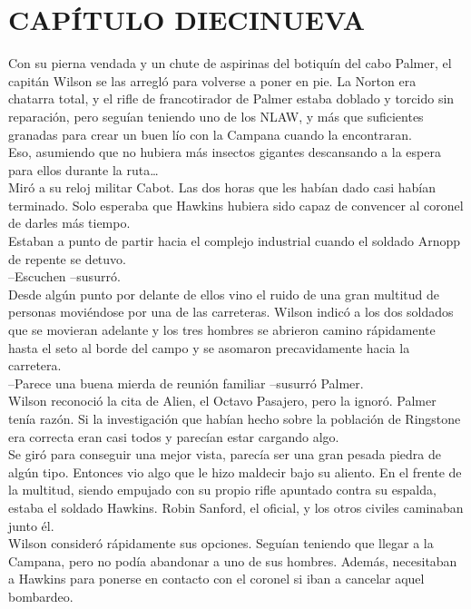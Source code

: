 \chapter*{CAPÍTULO DIECINUEVA}
Con su pierna vendada y un chute de aspirinas del botiquín del cabo
Palmer, el capitán Wilson se las arregló para volverse a poner en pie.
La Norton era chatarra total, y el rifle de francotirador de Palmer
estaba doblado y torcido sin reparación, pero seguían teniendo uno de
los NLAW, y más que suficientes granadas para crear un buen lío con la
Campana cuando la encontraran.\\
Eso, asumiendo que no hubiera más insectos gigantes descansando a la
espera para ellos durante la ruta\ldots{}\\
Miró a su reloj militar Cabot. Las dos horas que les habían dado casi
habían terminado. Solo esperaba que Hawkins hubiera sido capaz de
convencer al coronel de darles más tiempo.\\
Estaban a punto de partir hacia el complejo industrial cuando el soldado
Arnopp de repente se detuvo.\\
--Escuchen --susurró.\\
Desde algún punto por delante de ellos vino el ruido de una gran
multitud de personas moviéndose por una de las carreteras. Wilson indicó
a los dos soldados que se movieran adelante y los tres hombres se
abrieron camino rápidamente hasta el seto al borde del campo y se
asomaron precavidamente hacia la carretera.\\
--Parece una buena mierda de reunión familiar --susurró Palmer.\\
Wilson reconoció la cita de Alien, el Octavo Pasajero, pero la ignoró.
Palmer tenía razón. Si la investigación que habían hecho sobre la
población de Ringstone era correcta eran casi todos y parecían estar
cargando algo.\\
Se giró para conseguir una mejor vista, parecía ser una gran pesada
piedra de algún tipo. Entonces vio algo que le hizo maldecir bajo su
aliento. En el frente de la multitud, siendo empujado con su propio
rifle apuntado contra su espalda, estaba el soldado Hawkins. Robin
Sanford, el oficial, y los otros civiles caminaban junto él.\\
Wilson consideró rápidamente sus opciones. Seguían teniendo que llegar a
la Campana, pero no podía abandonar a uno de sus hombres. Además,
necesitaban a Hawkins para ponerse en contacto con el coronel si iban a
cancelar aquel bombardeo.\\
